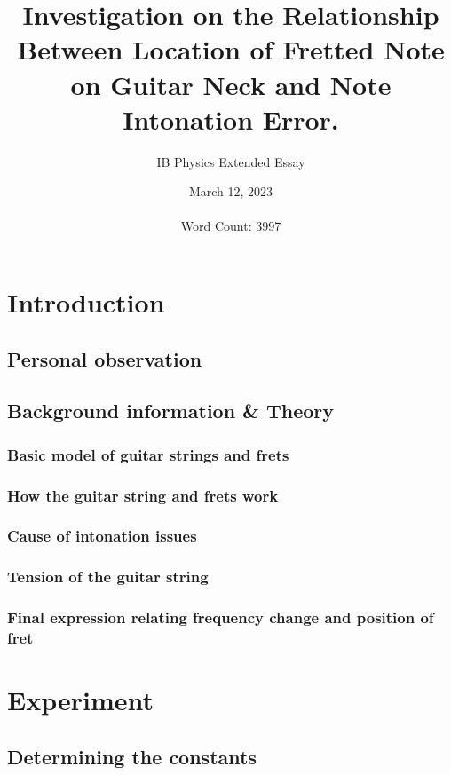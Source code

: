 \documentclass[12pt]{article}
\title{Investigation on the Relationship Between Location of Fretted Note on Guitar Neck and Note Intonation Error.}
\author{IB Physics Extended Essay}
\date{March 12, 2023 \\~\\ Word Count: 3997}
\begin{document}
    \maketitle
    \newpage
    \tableofcontents
    \newpage
    \begin{flushleft}
        \section{Introduction}
            \subsection{Personal observation}
                
            \subsection{Background information \& Theory}
                \subsubsection*{Basic model of guitar strings and frets}
                    
                \subsubsection*{How the guitar string and frets work}
                    
                \subsubsection*{Cause of intonation issues}
                    
                \subsubsection*{Tension of the guitar string}
                    
                \subsubsection*{Final expression relating frequency change and position of fret}
                    
        \section{Experiment}
            
            \subsection{Determining the constants}
                

\end{flushleft}
\end{document}
